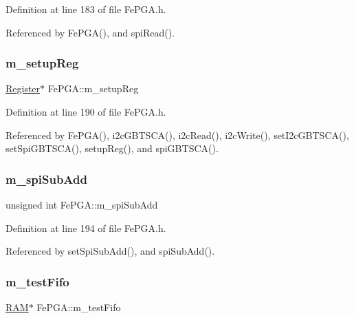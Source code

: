Definition at line 183 of file Fe\+P\+G\+A.\+h.



Referenced by Fe\+P\+G\+A(), and spi\+Read().

\mbox{\label{classFePGA_a0255fe229013986b4387c3a75ddf4e97}} 
\subsubsection{\texorpdfstring{m\+\_\+setup\+Reg}{m\_setupReg}}
{\footnotesize\ttfamily \hyperlink{classRegister}{Register}$\ast$ Fe\+P\+G\+A\+::m\+\_\+setup\+Reg\hspace{0.3cm}{\ttfamily [private]}}



Definition at line 190 of file Fe\+P\+G\+A.\+h.



Referenced by Fe\+P\+G\+A(), i2c\+G\+B\+T\+S\+C\+A(), i2c\+Read(), i2c\+Write(), set\+I2c\+G\+B\+T\+S\+C\+A(), set\+Spi\+G\+B\+T\+S\+C\+A(), setup\+Reg(), and spi\+G\+B\+T\+S\+C\+A().

\mbox{\label{classFePGA_a4f2f5d175aeb6dcaf497f81d2f075411}} 
\subsubsection{\texorpdfstring{m\+\_\+spi\+Sub\+Add}{m\_spiSubAdd}}
{\footnotesize\ttfamily unsigned int Fe\+P\+G\+A\+::m\+\_\+spi\+Sub\+Add\hspace{0.3cm}{\ttfamily [private]}}



Definition at line 194 of file Fe\+P\+G\+A.\+h.



Referenced by set\+Spi\+Sub\+Add(), and spi\+Sub\+Add().

\mbox{\label{classFePGA_a97fc9347c90d9a31d99ccb499cc06eee}} 
\subsubsection{\texorpdfstring{m\+\_\+test\+Fifo}{m\_testFifo}}
{\footnotesize\ttfamily \hyperlink{classRAM}{R\+AM}$\ast$ Fe\+P\+G\+A\+::m\+\_\+test\+Fifo\hspace{0.3cm}{\ttfamily [private]}}




